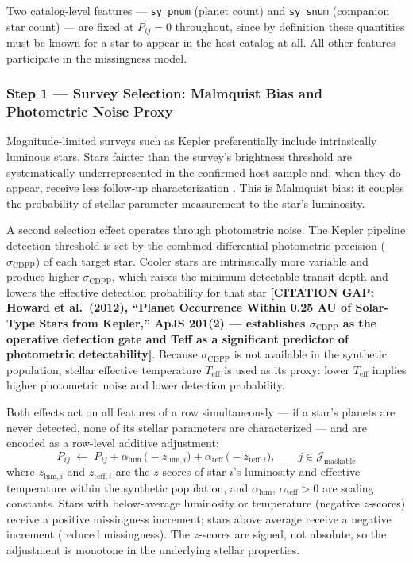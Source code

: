\documentclass[preprint]{aastex631}
\begin{document}
Two catalog-level features --- \texttt{sy\_pnum} (planet count) and \texttt{sy\_snum} (companion star count) --- are fixed at $P_{ij} = 0$ throughout, since by definition these quantities must be known for a star to appear in the host catalog at all. All other features participate in the missingness model.

\subsubsection*{Step 1 --- Survey Selection: Malmquist Bias and Photometric Noise Proxy}

Magnitude-limited surveys such as Kepler preferentially include intrinsically luminous stars. Stars fainter than the survey's brightness threshold are systematically underrepresented in the confirmed-host sample and, when they do appear, receive less follow-up characterization \citep{gaidosOBJECTSKEPLERSMIRROR2012}. This is Malmquist bias: it couples the probability of stellar-parameter measurement to the star's luminosity.

A second selection effect operates through photometric noise. The Kepler pipeline detection threshold is set by the combined differential photometric precision ($\sigma_{\mathrm{CDPP}}$) of each target star. Cooler stars are intrinsically more variable and produce higher $\sigma_{\mathrm{CDPP}}$, which raises the minimum detectable transit depth and lowers the effective detection probability for that star \textbf{[CITATION GAP: Howard et al.\ (2012), ``Planet Occurrence Within 0.25 AU of Solar-Type Stars from Kepler,'' ApJS 201(2) --- establishes $\sigma_{\mathrm{CDPP}}$ as the operative detection gate and Teff as a significant predictor of photometric detectability]}. Because $\sigma_{\mathrm{CDPP}}$ is not available in the synthetic population, stellar effective temperature $T_{\mathrm{eff}}$ is used as its proxy: lower $T_{\mathrm{eff}}$ implies higher photometric noise and lower detection probability.

Both effects act on all features of a row simultaneously --- if a star's planets are never detected, none of its stellar parameters are characterized --- and are encoded as a row-level additive adjustment:
\begin{equation}
  P_{ij} \;\leftarrow\; P_{ij}
    + \alpha_{\mathrm{lum}}\,\bigl(-z_{\mathrm{lum},i}\bigr)
    + \alpha_{\mathrm{teff}}\,\bigl(-z_{\mathrm{teff},i}\bigr),
  \qquad j \in \mathcal{J}_{\mathrm{maskable}}
  \label{eq:rshm-step1}
\end{equation}
where $z_{\mathrm{lum},i}$ and $z_{\mathrm{teff},i}$ are the $z$-scores of star $i$'s luminosity and effective temperature within the synthetic population, and $\alpha_{\mathrm{lum}}$, $\alpha_{\mathrm{teff}} > 0$ are scaling constants. Stars with below-average luminosity or temperature (negative $z$-scores) receive a positive missingness increment; stars above average receive a negative increment (reduced missingness). The $z$-scores are signed, not absolute, so the adjustment is monotone in the underlying stellar properties.
\end{document}
